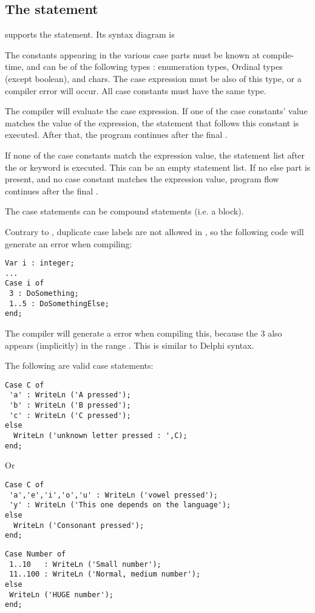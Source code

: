 \subsection{The  statement}
\fpc supports the  statement. Its syntax diagram is

The constants appearing in the various case parts must be known at
compile-time, and can be of the following types : enumeration types,
Ordinal types (except boolean), and chars. The case expression must be also of
this type, or a compiler error will occur. All case constants must
have the same type.

The compiler will evaluate the case expression. If one of the case
constants' value matches the value of the expression, the statement that follows
this constant is executed. After that, the program continues after the final
.

If none of the case constants match the expression value, the statement
list after the   or  
keyword is executed. This can be an empty statement list.
If no else part is present, and no case constant matches the expression
value, program flow continues after the final .

The case statements can be compound statements (i.e. a  block).

\begin{remark}
Contrary to \tp, duplicate case labels are not
allowed in \fpc, so the following code will generate an error when
compiling:
\begin{verbatim}
Var i : integer;
...
Case i of
 3 : DoSomething;
 1..5 : DoSomethingElse;
end;
\end{verbatim}
The compiler will generate a  error when compiling
this, because the 3 also appears (implicitly) in the range . This
is similar to Delphi syntax.
\end{remark}
The following are valid case statements:
\begin{verbatim}
Case C of
 'a' : WriteLn ('A pressed');
 'b' : WriteLn ('B pressed');
 'c' : WriteLn ('C pressed');
else
  WriteLn ('unknown letter pressed : ',C);
end;
\end{verbatim}
Or
\begin{verbatim}
Case C of
 'a','e','i','o','u' : WriteLn ('vowel pressed');
 'y' : WriteLn ('This one depends on the language');
else
  WriteLn ('Consonant pressed');
end;
\end{verbatim}
\begin{verbatim}
Case Number of
 1..10   : WriteLn ('Small number');
 11..100 : WriteLn ('Normal, medium number');
else
 WriteLn ('HUGE number');
end;
\end{verbatim}

